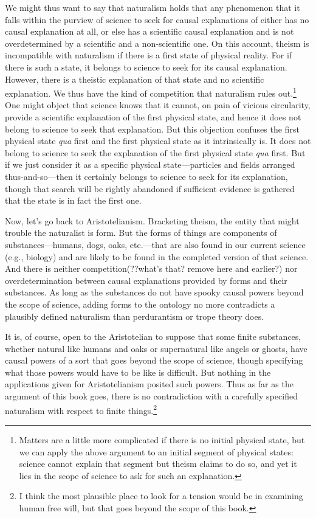 We might thus want to say that naturalism holds that any phenomenon that it falls within the purview of science 
to seek for causal explanations of either has no causal explanation at all, or else has a scientific causal explanation 
and is not overdetermined by a scientific and a non-scientific one. On this account, theism is incompatible with
naturalism if there is a first state of physical reality. For if there is such a state, it belongs
to science to seek for its causal explanation. However, there is a theistic explanation of that state and no 
scientific explanation. We thus have the kind of competition that naturalism rules out.\footnote{Matters are a little more
complicated if there is no initial physical state, but we can apply the above argument to an initial
segment of physical states: science cannot explain that segment but theism claims to do so, and yet it lies
in the scope of science to ask for such an explanation.} One might object that science knows that it cannot, on pain
of vicious circularity, provide a scientific explanation of the first physical state, and hence it does not belong to
science to seek that explanation. But this objection confuses the first physical state \textit{qua} first and the
first physical state as it intrinsically is. It does not belong to science to seek the explanation of the first physical
state \textit{qua} first. But if we just consider it as a specific physical state---particles and fields arranged thus-and-so---then
it certainly belongs to science to seek for its explanation, though that search will be rightly abandoned if sufficient evidence
is gathered that the state is in fact the first one.

Now, let's go back to Aristotelianism. Bracketing theism, the entity that might trouble the naturalist is form.
But the forms of things are components of substances---humans, dogs, oaks, etc.---that are also found in our current
science (e.g., biology) and are likely to be found in the completed version of that science. And there is neither
competition(??what's that? remove here and earlier?) nor overdetermination between causal explanations provided by
forms and their substances. As long as the substances do not have spooky causal powers beyond the scope of science,
adding forms to the ontology no more contradicts a plausibly defined naturalism than perdurantism or trope theory
does.

It is, of course, open to the Aristotelian to suppose that some finite substances, whether natural like humans and oaks 
or  supernatural like angels or ghosts, have causal powers of a sort that goes beyond the scope of science, though
specifying what those powers would have to be like is difficult. But nothing in the applications given for Aristotelianism
posited such powers. Thus as far as the argument of this book goes, there is no contradiction with a carefully
specified naturalism with respect to finite things.\footnote{I think the most plausible place to look for a tension 
would be in examining human free will, but that goes beyond the scope of this book.}

\chaptertail 


